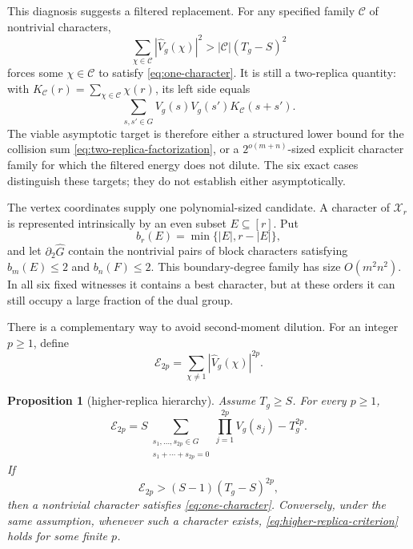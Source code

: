 \documentclass[11pt]{article}
\newtheorem{proposition}[theorem]{Proposition}
\theoremstyle{definition}
\theoremstyle{remark}
\begin{document}
This diagnosis suggests a filtered replacement.  For any specified family
$\mathcal C$ of nontrivial characters,
\begin{equation}\label{eq:filtered-two-replica}
 \sum_{\chi\in\mathcal C}|\widehat V_g(\chi)|^2
 >|\mathcal C|(T_g-S)^2
\end{equation}
forces some $\chi\in\mathcal C$ to satisfy \eqref{eq:one-character}.  It is
still a two-replica quantity: with
$K_{\mathcal C}(r)=\sum_{\chi\in\mathcal C}\chi(r)$, its left side equals
\[
 \sum_{s,s'\in G}V_g(s)V_g(s')K_{\mathcal C}(s+s').
\]
The viable asymptotic target is therefore either a structured lower bound for
the collision sum \eqref{eq:two-replica-factorization}, or a
$2^{o(m+n)}$-sized explicit character family for which the filtered energy
does not dilute.  The six exact cases distinguish these targets; they do not
establish either asymptotically.

The vertex coordinates supply one polynomial-sized candidate.  A character
of $\mathcal X_r$ is represented intrinsically by an even subset
$E\subseteq[r]$.  Put
\[
 b_r(E)=\min\{|E|,r-|E|\},
\]
and let $\partial_2\widehat G$ contain the nontrivial pairs of block
characters satisfying $b_m(E)\le2$ and $b_n(F)\le2$.  This boundary-degree
family has size $O(m^2n^2)$.  In all six fixed witnesses it contains a best
character, but at these orders it can still occupy a large fraction of the
dual group.

There is a complementary way to avoid second-moment dilution.  For an
integer $p\ge1$, define
\[
 \mathcal E_{2p}
 =\sum_{\chi\ne1}|\widehat V_g(\chi)|^{2p}.
\]

\begin{proposition}[higher-replica hierarchy]\label{prop:higher-replica}
Assume $T_g\ge S$.  For every $p\ge1$,
\begin{equation}\label{eq:higher-replica}
 \mathcal E_{2p}
 =S\!\!\sum_{\substack{s_1,\ldots,s_{2p}\in G\\
                       s_1+\cdots+s_{2p}=0}}
   \prod_{j=1}^{2p}V_g(s_j)-T_g^{2p}.
\end{equation}
If
\begin{equation}\label{eq:higher-replica-criterion}
 \mathcal E_{2p}>(S-1)(T_g-S)^{2p},
\end{equation}
then a nontrivial character satisfies \eqref{eq:one-character}.  Conversely,
under the same assumption, whenever such a character exists,
\eqref{eq:higher-replica-criterion} holds for some finite $p$.
\end{proposition}
\end{document}
